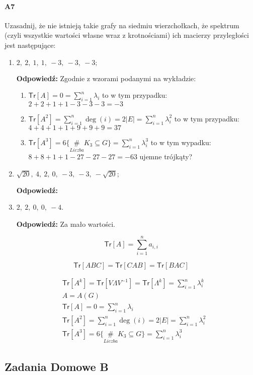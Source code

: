 \paragraph{A7} Uzasadnij, że nie istnieją takie grafy na siedmiu wierzchołkach, że spektrum (czyli wszystkie wartości własne wraz z krotnościami) ich macierzy przyległości jest następujące:
\begin{enumerate}[label=\alph*)]
\item $2,\ 2,\ 1,\ 1,\ -3,\ -3,\ -3;$

\textbf{Odpowiedź: }Zgodnie z wzorami podanymi na wykładzie:
\begin{enumerate}[label=\arabic*.]
\item $\mathsf{Tr}[A]=0=\sum_{i=1}^n\lambda _i$ to w tym przypadku: $2+2+1+1-3-3-3 = -3$
\item $\mathsf{Tr}[A^2]=\sum_{i=1}^n\deg (i)=2|E|=\sum_{i=1}^n\lambda ^2_i$ to w tym przypadku: $4+4+1+1+9+9+9=37$ 
\item $\mathsf{Tr}[A^3]=6 \{\underset{Liczba}{\#} K_3 \subseteq G\}=\sum_{i=1}^n\lambda ^3_i$ to w tym wypadku: $8+8+1+1-27-27-27=-63$ ujemne trójkąty?
\end{enumerate}


\item $\sqrt{20},\ 4,\ 2,\ 0,\ -3,\ -3,\ -\sqrt{20};$

\textbf{Odpowiedź: }
\item $2,\ 2,\ 0,\ 0,\ -4$.

\textbf{Odpowiedź: }Za mało wartości.
\end{enumerate}


$$\mathsf{Tr}[A]=\sum_{i=1}^n a_{i,i}$$
\begin{fact*}
$$\mathsf{Tr}[ABC]=\mathsf{Tr}[CAB]=\mathsf{Tr}[BAC]$$
\end{fact*}
\begin{align*}
&\mathsf{Tr}[A^k]=\mathsf{Tr}[V \Lambda V^{-1}]=\mathsf{Tr}[\Lambda ^k]=\sum_{i=1}^n\lambda_i^k\\
&A=A(G)\\
&\mathsf{Tr}[A]=0=\sum_{i=1}^n\lambda _i\\
&\mathsf{Tr}[A^2]=\sum_{i=1}^n\deg (i)=2|E|=\sum_{i=1}^n\lambda ^2_i\\
&\mathsf{Tr}[A^3]=6 \{\underset{Liczba}{\#} K_3 \subseteq G\}=\sum_{i=1}^n\lambda ^3_i
\end{align*}

\subsection{Zadania Domowe B}
